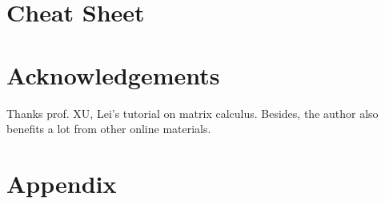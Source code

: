 \section{Cheat Sheet}
\label{sec:cheat}


\section*{Acknowledgements}
Thanks prof. XU, Lei's tutorial on matrix calculus\cite{xu2012-mlt}. 
Besides, the author also benefits a lot from other online 
materials. 



\section*{Appendix}



